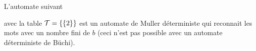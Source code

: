 \begin{exemple}
	L'automate suivant

	\begin{automata}
	\end{automata}

	avec la table $\mathcal T = \left\{\left\{2\right\}\right\}$ est un automate de Muller déterministe qui reconnait les mots avec un nombre
	fini de $b$ (ceci n'est pas possible avec un automate déterministe de Büchi).
\end{exemple}
